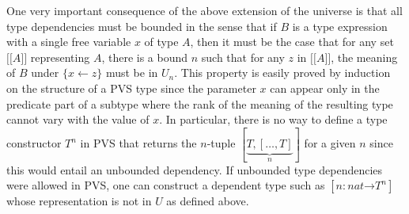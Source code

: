 \documentclass [12pt,twoside]{cslreport}
\newcommand{\aro}{\mathord\rightarrow} %
\newcommand{\mean}[1]{\lbrack\!\lbrack #1 \rbrack\!\rbrack}
\newcommand{\funtype}[2]{[#1 \aro #2]}
\begin{document}
One very important consequence of the above extension of the universe
is that all type dependencies must be bounded in the sense that
if $B$ is a type expression with a single free variable $x$ of type $A$,
then it must be the case that for any set $\mean{A}$ representing $A$,
there is a bound $n$ such that for any $z$ in $\mean{A}$, the meaning of 
$B$ under $\{x \gets z\}$ must be in $U_n$\@.  This property is easily
proved by induction on the structure of a PVS type since the parameter
$x$ can appear only in the predicate part of a subtype where the
rank of the meaning of the resulting type cannot vary with the value
of $x$\@.   In
particular, there is no way to define a type constructor $T^n$ in PVS that
returns the $n$-tuple $[\underbrace{T, [\ldots, T]}_n]$ for a given $n$
since this would entail an unbounded dependency.  
If unbounded type dependencies were allowed in PVS,
one can construct a dependent type such as $\funtype{n : nat}{T^n}$
whose representation is not in $U$ as defined above.    
  

\end{document}
